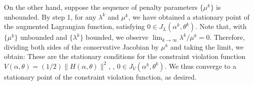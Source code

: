 On the other hand, suppose the sequence of penalty parameters $\{\mu^k\}$ is unbounded. By step 1, for any $\lambda^k$ and $\mu^k$, we have obtained a stationary point of the augmented Lagrangian function, satisfying $0 \in J_L(\alpha^k,\theta^k)$.
Note that, with $\{\mu^k\}$ unbounded and $\{\lambda^k\}$ bounded, we observe $\lim_{k \rightarrow \infty} \lambda^k/
\mu^k = 0$. 
Therefore, dividing both sides of the conservative Jacobian by $\mu^k$ and taking the limit, we obtain:
These are the stationary conditions for the constraint violation function $V(\alpha,\theta) = (1/2)\|H(\alpha,\theta)\|^2$, \ie, $0 \in J_V(\alpha^k,\theta^k)$. 
We thus converge to a stationary point of the constraint violation function, as desired. 


